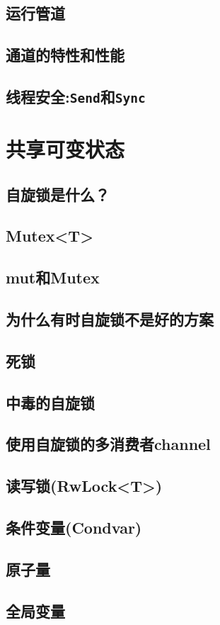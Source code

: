 \subsection{运行管道}

\subsection{通道的特性和性能}

\subsection{线程安全:\texttt{Send}和\texttt{Sync}}\label{threadsafe}

\section{共享可变状态}

\subsection{自旋锁是什么？}

\subsection{Mutex<T>}\label{mutex}

\subsection{mut和Mutex}

\subsection{为什么有时自旋锁不是好的方案}

\subsection{死锁}

\subsection{中毒的自旋锁}

\subsection{使用自旋锁的多消费者channel}

\subsection{读写锁(RwLock<T>)}

\subsection{条件变量(Condvar)}

\subsection{原子量}\label{atomic}

\subsection{全局变量}\label{globalvar}